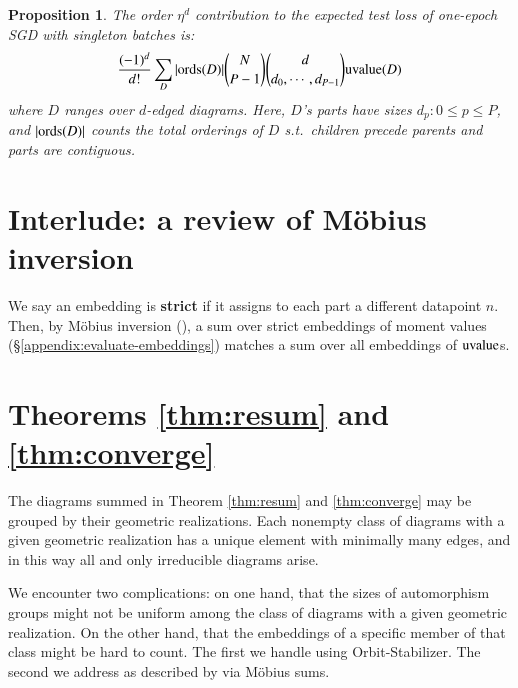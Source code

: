 \documentclass[openany, notitlepage, justified]{tufte-book}
\theoremstyle{plain}
\newtheorem{prop}{Proposition}
\theoremstyle{definition}
\newcommand{\uvalue}{\text{\textnormal{uvalue}}}
\newcommand{\ords}{\text{\textnormal{ords}}}
\begin{document}
        \begin{prop} \label{prop:vanilla}
            The order $\eta^d$ contribution to the expected test loss of
            one-epoch SGD with singleton batches is:
            \begin{equation*}\label{eq:sgdbasiccoef}
                \frac{(-1)^d}{d!} \sum_{D} 
                |\ords(D)| {N \choose P-1} {d \choose d_0,\cdots,d_{P-1}}
                \uvalue(D)
            \end{equation*}
            where $D$ ranges over $d$-edged diagrams.  Here, $D$'s parts have
            sizes $d_p: 0\leq p\leq P$, and $|\ords(D)|$ counts the total
            orderings of $D$ s.t.\ children precede parents and parts are
            contiguous.
        \end{prop}

    \section{Interlude: a review of M\"obius inversion}          \label{appendix:mobius}

        We say an embedding is \textbf{strict} if it assigns to each part
        a different datapoint $n$.
        Then, by M\"obius inversion (\citep{ro64}), a sum over strict embeddings
        of moment values (\S\ref{appendix:evaluate-embeddings}) matches 
        a sum over all embeddings of $\uvalue$s.

    \section{Theorems \ref{thm:resum} and \ref{thm:converge}}    \label{appendix:resum}

        The diagrams summed in Theorem \ref{thm:resum} and \ref{thm:converge}
        may be grouped by their geometric realizations.  Each nonempty class of
        diagrams with a given geometric realization has a unique element with
        minimally many edges, and in this way all and only irreducible diagrams
        arise. 

        We encounter two complications: on one hand, that the sizes of
        automorphism groups might not be uniform among the class of diagrams
        with a given geometric realization.  On the other hand, that the
        embeddings of a specific member of that class might be hard to count.
        The first we handle using Orbit-Stabilizer.  The second we address as
        described by \label{subsubsect:mobius} via M\"obius sums.
           
\end{document}
